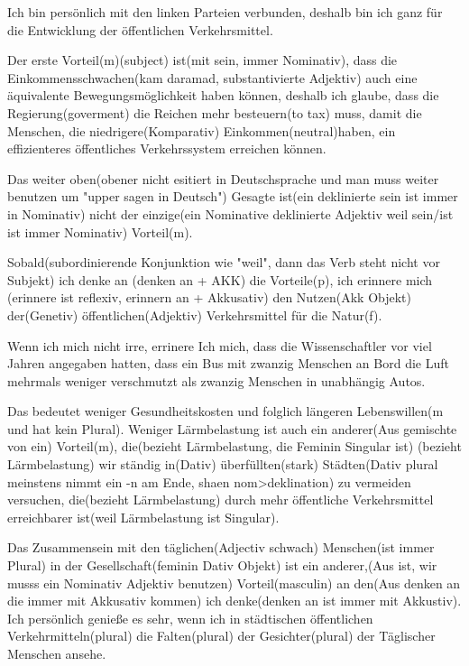 \documentclass[a4paper,11pt]{article}
\begin{document}
      Ich bin persönlich mit den linken Parteien verbunden, deshalb bin ich ganz für  die Entwicklung der öffentlichen Verkehrsmittel.

      Der erste Vorteil(m)(subject) ist(mit sein, immer Nominativ), dass die Einkommensschwachen(kam daramad, substantivierte Adjektiv)  auch eine äquivalente Bewegungsmöglichkeit haben können, deshalb ich glaube, dass die Regierung(goverment)  die Reichen mehr besteuern(to tax) muss, damit die Menschen, die niedrigere(Komparativ) Einkommen(neutral)haben, ein effizienteres öffentliches Verkehrssystem erreichen können.

      Das weiter oben(obener nicht esitiert in Deutschsprache und  man muss weiter benutzen um "upper sagen in Deutsch") Gesagte ist(ein deklinierte sein ist immer in Nominativ) nicht der einzige(ein Nominative deklinierte Adjektiv weil sein/ist ist immer Nominativ) Vorteil(m).

      Sobald(subordinierende Konjunktion wie "weil", dann das Verb steht nicht vor Subjekt) ich denke an (denken an + AKK) die Vorteile(p), ich erinnere mich (erinnere ist reflexiv, erinnern an + Akkusativ) den Nutzen(Akk Objekt) der(Genetiv) öffentlichen(Adjektiv) Verkehrsmittel für die Natur(f).

      Wenn ich mich nicht irre,  errinere Ich mich, dass die Wissenschaftler vor viel Jahren angegaben hatten, dass ein Bus mit zwanzig Menschen an Bord  die Luft mehrmals weniger verschmutzt als zwanzig Menschen in unabhängig Autos.

      Das bedeutet weniger Gesundheitskosten und folglich längeren Lebenswillen(m und hat kein Plural). Weniger Lärmbelastung ist auch ein anderer(Aus gemischte von ein) Vorteil(m), die(bezieht Lärmbelastung, die Feminin Singular ist)  (bezieht Lärmbelastung) wir  ständig in(Dativ) überfüllten(stark) Städten(Dativ plural meinstens nimmt ein -n am Ende, shaen nom>deklination) zu vermeiden versuchen, die(bezieht Lärmbelastung) durch mehr öffentliche Verkehrsmittel  erreichbarer ist(weil Lärmbelastung ist Singular).

      Das Zusammensein mit den täglichen(Adjectiv schwach) Menschen(ist immer Plural) in der Gesellschaft(feminin Dativ Objekt) ist ein anderer,(Aus ist, wir musss ein Nominativ Adjektiv benutzen) Vorteil(masculin) an den(Aus denken an die immer mit Akkusativ kommen) ich denke(denken an ist immer mit Akkustiv). Ich persönlich genieße es sehr, wenn ich in städtischen öffentlichen Verkehrmitteln(plural) die Falten(plural) der Gesichter(plural) der Täglischer Menschen ansehe.
\end{document}

